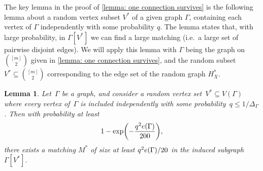 \documentclass[11pt,reqno,oneside]{amsart}
\newtheorem{lemma}[theorem]{Lemma}
\theoremstyle{definition}
\newcommand\1{\mathbf{1}}
\DeclarePairedDelimiter{\paren}{\lparen}{\rparen}
\newcommand{\su}{\subseteq}
\let\leq\leqslant
\begin{document}
The key lemma in the proof of \cref{lemma: one connection survives} is the following lemma about a random vertex subset $V^*$ of a given graph $\Gamma$, containing each vertex of $\Gamma$ independently with some probability $q$. The lemma states that, with large probability, in $\Gamma[V^*]$ we can find a large matching (i.e.\ a large set of pairwise disjoint edges). We will apply this lemma with $\Gamma$ being the graph on $\binom{[m]}2$ given in \cref{lemma: one connection survives}, and the random subset $V^*\su \binom{[m]}2$ corresponding to the edge set of the random graph $H^*_X$.

\begin{lemma}\label{lem:first-two-sparsifications}
 Let~$\Gamma$ be a graph, and consider a random vertex set~$V^*\subseteq V(\Gamma)$ where every vertex of~$\Gamma$ is included independently with some probability~$q\leq 1/\Delta_\Gamma$.  Then with probability at least
  \[1-\exp\paren[\bigg]{-\frac{q^2e\paren{\Gamma}}{200}},\] there exists a 
  matching $M^\ast$ of size at least $q^2e\paren{\Gamma}/20$ in the induced subgraph $\Gamma[V^*]$. 
\end{lemma}
\end{document}
